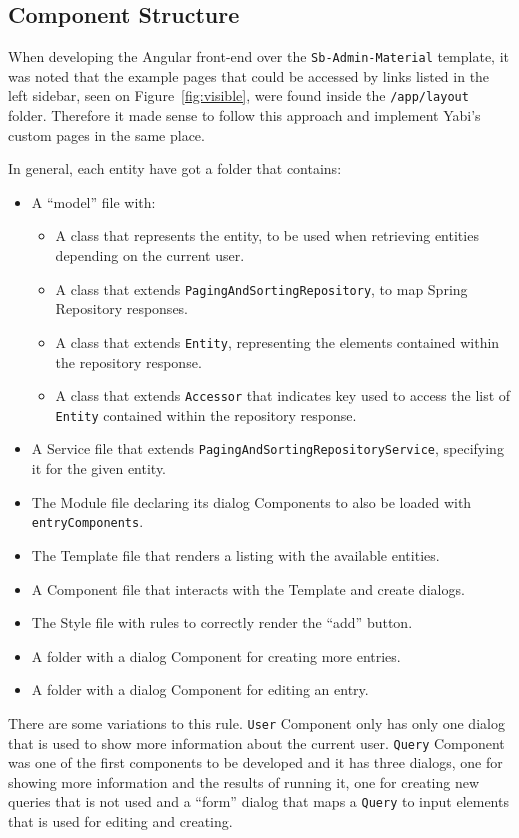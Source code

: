 \subsection{Component Structure}
When developing the Angular front-end over the \texttt{Sb-Admin-Material} template, it was noted that the example pages that could be accessed by links listed in the left sidebar, seen on Figure~\ref{fig:visible}, were found inside the \texttt{/app/layout} folder. Therefore it made sense to follow this approach and implement \gls{Yabi}'s custom pages in the same place.

In general, each entity have got a folder that contains:
\begin{itemize}
\item A ``model'' file with:
  \begin{itemize}
  \item A class that represents the entity, to be used when retrieving entities depending on the current user.
  \item A class that extends \texttt{PagingAndSortingRepository}, to map Spring Repository responses.
  \item A class that extends \texttt{Entity}, representing the elements contained within the repository response.
  \item A class that extends \texttt{Accessor} that indicates key used to access the list of \texttt{Entity} contained within the repository response.
  \end{itemize}
\item A Service file that extends \texttt{PagingAndSortingRepositoryService}, specifying it for the given entity.
\item The Module file declaring its dialog Components to also be loaded with \texttt{entryComponents}.
\item The Template file that renders a listing with the available entities.
\item A Component file that interacts with the Template and create dialogs.
\item The Style file with rules to correctly render the ``add'' button.
\item A folder with a dialog Component for creating more entries.
\item A folder with a dialog Component for editing an entry.
\end{itemize}

There are some variations to this rule. \texttt{User} Component only has only one dialog that is used to show more information about the current user. \texttt{Query} Component was one of the first components to be developed and it has three dialogs, one for showing more information and the results of running it, one for creating new queries that is not used and a ``form'' dialog that maps a \texttt{Query} to input elements that is used for editing and creating.

